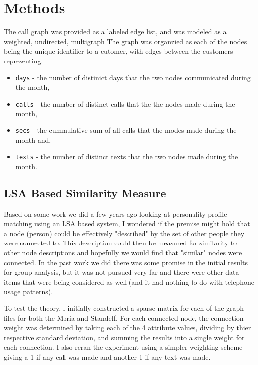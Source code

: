 \section{Methods}
\label{sec:Methods}

The call graph was provided as a labeled edge list, and was modeled as a weighted, undirected, multigraph
The graph was organzied as each of the nodes being the unique identifier to a cutomer, with edges between the customers representing:
\begin{itemize}
	\item \texttt{days} - the number of distinict days that the two nodes communicated during the month,
	\item \texttt{calls} - the number of distinct calls that the the nodes made during the month,
	\item \texttt{secs} - the cummulative sum of all calls that the modes made during the month and,
	\item \texttt{texts} - the number of distinct texts that the two nodes made during the month.
\end{itemize}

\subsection{LSA Based Similarity Measure}
Based on some work we did a few years ago looking at personality profile
matching using an LSA based system, I wondered if the premise might hold that
a node (person) could be effectively "described" by the set of other people
they were connected to.  This description could then be measured for
similarity to other node descriptions and hopefully we would find that
"similar" nodes were connected. In the past work we did there was some promise
in the initial results for group analysis, but it was not pursued very far and
there were other data items that were being considered as well (and it had
nothing to do with telephone usage patterns).

To test the theory, I initially constructed a sparse matrix for each of the
graph files for both the Moria and Standelf.  For each connected node, the
connection weight was determined by taking each of the 4 attribute values,
dividing by thier respective standard deviation, and summing the results into
a single weight for each connection. I also reran the experiment using a
simpler weighting scheme giving a 1 if any call was made and another 1 if any
text was made.

